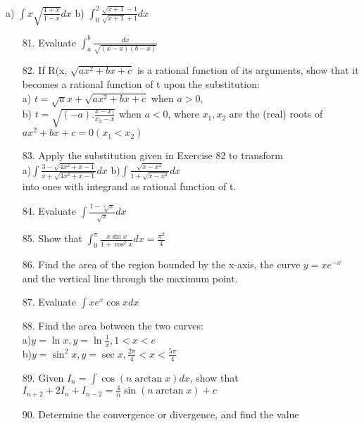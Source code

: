 \documentclass[11pt]{amsbook}
\begin{document}
	
	a) $\int x \sqrt{\frac{1+x}{1-x}}dx$ \quad
    	b) $\int^2_0 {\frac{\sqrt{x+1}-1}{\sqrt{x+1}+1}}dx$	
	
	\begin{enumerate}
		

    	\item[81.]
    	Evaluate $\int^b_a \frac{dx} {\sqrt{(x-a)(b-x)}}$

    	\item[82.]
    	If R(x, $\sqrt{ax^2 + bx + c}$ is a rational function of its arguments, show that it becomes a rational function of t upon the substitution: \\
    	a) $ t = \sqrt{a}x+\sqrt{ax^2 + bx + c}$ when $a > 0,$\\
    	b) $ t = \sqrt{(-a).\frac{x - x_1}{x_2 - x}}$ when $a < 0$, where $x_1, x_2$ are the (real) roots of $ax^2+bx+c=0 (x_1 < x_2)$

    	\item[83.]
    	Apply the substitution given in Exercise 82 to transform\\
   	a)$\int\frac{3-\sqrt{4x^2+x-1}}{x+\sqrt{4x^2+x-1}}dx$
    	b)$\int\frac{\sqrt{x - x^2}}{1 + \sqrt{x - x^2}}dx$ \\
    	into ones with integrand as rational function of t.

    	\item[84.]
    	Evaluate $\int \frac{1-\sqrt[3]{x}}{\sqrt{x}}dx$

    	\item[85.]
    	Show that $\int^\pi_0 \frac{x \sin x}{1+\cos ^2x}dx = \frac{\pi^2}{4}$

    	\item[86.]
    	Find the area of the region bounded by the x-axis, the curve $y=xe^{-x}$ and the vertical line through the maximum point.

    	\item[87.]
    	Evaluate $\int x e^x \cos x dx$

    	\item[88.]
    	Find the area between the two curves:\\
    	a)$y=\ln x, y = \ln \frac{1}{x}, 1 < x < e $ \\
    	b)$y=\sin ^2x,y = \sec x, \frac{2\pi}{4} < x < \frac{5\pi}{4}$

    	\item[89.]
    	Given $I_n = \int \cos (n \arctan x)dx$, show that $I_{n+2} + 2I_n + I_{n-2} = \frac{4}{n} \sin (n \arctan x)+c$ 

    	\item[90.]
    	Determine the convergence or divergence, and find the value

	\end{enumerate}
\end{document}
